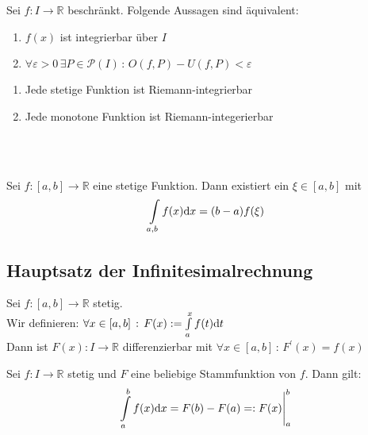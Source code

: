 		\begin{theorem}
			Sei $f:I \to \mathbb{R}$ beschränkt. Folgende Aussagen sind äquivalent:
			\begin{enumerate}
				\item $f(x)$ ist integrierbar über $I$
				\item $\forall \varepsilon > 0 \, \exists P \in \mathscr{P}(I) \, : \, O(f,P) - U(f,P) < \varepsilon$
			\end{enumerate}
		\end{theorem}
		\begin{theorem}
			\hfill
			\begin{enumerate}
				\item Jede stetige Funktion ist Riemann-integrierbar
				\item Jede monotone Funktion ist Riemann-integerierbar
			\end{enumerate}
		\end{theorem}
		\\[1em]
		\begin{theorem}\hfill\\
			Sei $f:[a,b] \to \mathbb{R}$ eine stetige Funktion. Dann existiert ein $\xi \in [a,b]$ mit 
			$$ \int\limits_{a,b} f(x) \mathrm{d} x = (b-a) f(\xi)$$
		\end{theorem}
	\subsection{Hauptsatz der Infinitesimalrechnung}
		\begin{theorem}[Hauptsatz A]
			Sei $f:[a,b] \to \mathbb{R}$ stetig. \\
			Wir definieren: $\forall x \in [a,b] \, : \, F(x) := \int\limits_{a}^x f(t) \mathrm{d} t$ \\
			Dann ist $F(x): I \to \mathbb{R}$ differenzierbar mit $\forall x \in [a,b] \, : \, F^\prime(x) = f(x)$
		\end{theorem}
		\begin{theorem}
			Sei $f: I \to \mathbb{R}$ stetig und $F$ eine beliebige Stammfunktion von $f$. Dann gilt:
			$$ \int\limits_{a}^b f(x) \mathrm{d} x = F(b) - F(a) =: F(x)\Bigg\vert_{a}^{b}$$
		\end{theorem}
